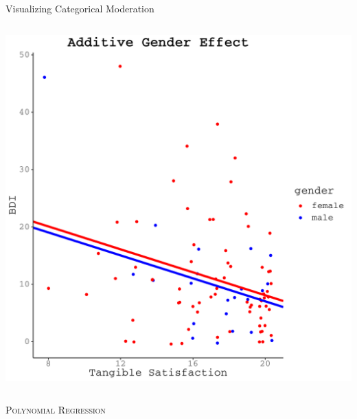 \documentclass{beamer}\usepackage[]{graphicx}\usepackage[]{color}
\makeatletter
\def\maxwidth{ %
  \ifdim\Gin@nat@width>\linewidth
    \linewidth
  \else
    \Gin@nat@width
  \fi
}
\newenvironment{knitrout}{}{} %
\makeatother
\begin{document}
\begin{frame}[fragile]{Visualizing Categorical Moderation}
\begin{columns}
\begin{column}{0.5\textwidth}
\begin{knitrout}
{\centering \includegraphics[width=\maxwidth]{figure/unnamed-chunk-25-1} 

}



\end{knitrout}

\end{column}
\end{columns}

\end{frame}

\watermarkon %

\begin{frame}{}
  
  \begin{center}
    \Huge{\textsc{Polynomial Regression}}
  \end{center}
  
\end{frame}

\end{document}

